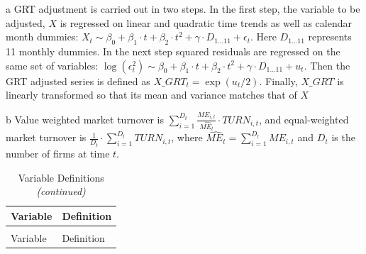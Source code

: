 \documentclass[
  12pt,
  a4paper,
  twoside,
  onecolumn]{article}
\begin{document}
\begin{landscape}\begingroup\fontsize{12}{14}\selectfont

\begin{ThreePartTable}
\begin{TableNotes}
\item[a] GRT adjustment is carried out in two steps. In the first step, the variable to be adjusted, $X$ is regressed on linear and quadratic time trends as well as calendar month dummies: $X_t \sim \beta_0 + \beta_1 \cdot t + \beta_2 \cdot t^2 + \gamma \cdot D_{1 \dots 11} + \epsilon_t$. Here $D_{1 \dots 11}$ represents 11 monthly dummies. In the next step squared residuals are regressed on the same set of variables: $\log (\epsilon_t^2) \sim \beta_0 + \beta_1 \cdot t + \beta_2 \cdot t^2 + \gamma \cdot D_{1 \dots 11} + u_t$. Then the GRT adjusted series is defined as $X\_GRT_t = \exp(u_t/2)$. Finally, $X\_GRT$ is linearly transformed so that its mean and variance matches that of $X$
\item[b] Value weighted market turnover is $\sum_{i=1}^{D_t} \frac{ME_{i,t}}{\widehat{ME_t}} \cdot TURN_{i,t}$, and equal-weighted market turnover is $\frac{1}{D_t} \cdot \sum_{i=1}^{D_t} TURN_{i,t}$, where $\widehat{ME_t} = \sum_{i=1}^{D_t} ME_{i,t}$ and $D_t$ is the number of firms at time $t$.
\end{TableNotes}
\begin{spacing}{1.0}
\begin{longtable}[t]{>{\raggedright\arraybackslash}p{5.2cm}>{\raggedright\arraybackslash}p{15.6cm}}
\caption[Variable Definitions]{\label{tab:var_def}Variable Definitions}\\
\toprule
Variable & Definition\\
\midrule
\endfirsthead
\caption[]{Variable Definitions \textit{(continued)}}\\
\toprule
Variable & Definition\\
\midrule
\endhead


\end{longtable}
\end{spacing}
\end{ThreePartTable}
\end{landscape}
\end{document}
